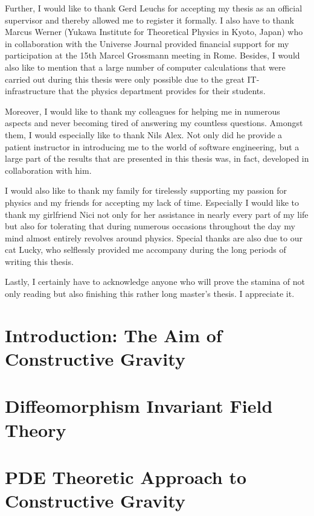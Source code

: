 \documentclass[a4paper,12pt, DIV=14, BCOR=5mm, twoside, headsepline, numbers=noenddot]{scrbook}
\begin{document}
Further, I would like to thank Gerd Leuchs for accepting my thesis as an official supervisor and thereby allowed me to register it formally. 
I also have to thank Marcus Werner (Yukawa Institute for Theoretical Physics in Kyoto, Japan) who in collaboration with the Universe Journal provided financial support for my participation at the 15th Marcel Grossmann meeting in Rome. 
Besides, I would also like to mention that a large number of computer calculations that were carried out during this thesis were only possible due to the great IT-infrastructure that the physics department provides for their students. 


Moreover, I would like to thank my colleagues for helping me in numerous aspects and never becoming tired of answering my countless questions.
Amongst them, I would especially like to thank Nils Alex.
Not only did he provide a patient instructor in introducing me to the world of software engineering, 
but a large part of the results that are presented in this thesis was, in fact, developed in collaboration with him. 


I would also like to thank my family for tirelessly supporting my passion for physics and my friends for accepting my lack of time.
Especially I would like to thank my girlfriend Nici not only for her assistance in nearly every part of my life but also
for tolerating that during numerous occasions throughout the day my mind almost entirely revolves around physics. 
Special thanks are also due to our cat Lucky, who selflessly provided me accompany during the long periods of writing this thesis. 

Lastly, I certainly have to acknowledge anyone who will prove the stamina of not only reading but also finishing this rather long master's thesis. I appreciate it. 

\mainmatter

\chapter{Introduction: The Aim of Constructive Gravity}


\chapter{Diffeomorphism Invariant Field Theory}\label{chapter1}


\chapter{PDE Theoretic Approach to Constructive Gravity}\label{chapter2}
 
\end{document}
